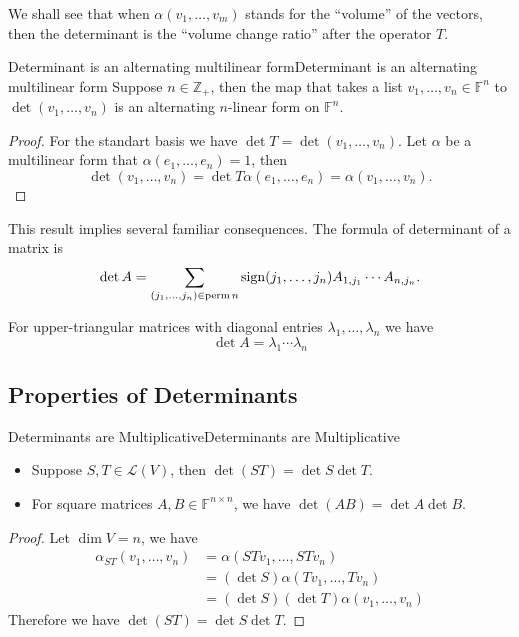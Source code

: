 \documentclass[../main.tex]{subfiles}
\begin{document}
\begin{remark}
We shall see that when $\alpha(v_1, \ldots ,v_m)$ stands for the ``volume'' of the vectors, then the determinant is the ``volume change ratio'' after the operator $T$.
\end{remark}

\begin{theorem}{Determinant is an alternating multilinear form}{Determinant is an alternating multilinear form}
Suppose $n\in \mathbb{Z}_+$, then the map that takes a list $v_1 , \ldots ,v_n\in \mathbb{F}^n$ to $\det (v_1, \ldots ,v_n)$ is an alternating $n$-linear form on $\mathbb{F}^n$.
\end{theorem}
\begin{proof}
For the standart basis we have $\det T = \det (v_1, \ldots ,v_n)$. Let $\alpha$ be a multilinear form that $\alpha(e_1, \ldots ,e_n)=1$, then
\begin{equation*}
\det (v_1, \ldots ,v_n) = \det T \alpha(e_1, \ldots ,e_n) = \alpha(v_1, \ldots ,v_n).
\end{equation*}
\end{proof}

This result implies several familiar consequences. The formula of determinant of a matrix is
\begin{equation}
	\det A = \sum_{(j_1, \ldots ,j_n)\in \operatorname{perm} n} \operatorname{sign} (j_1, \ldots ,j_n) A _{1,j_1} \cdots A _{n,j_n}.
\end{equation}

For upper-triangular matrices with diagonal entries $\lambda_1, \ldots ,\lambda_n$ we have
\begin{equation}
\det A = \lambda_1 \cdots \lambda_n
\end{equation}

\subsection{Properties of Determinants}
\begin{theorem}{Determinants are Multiplicative}{Determinants are Multiplicative}
\begin{itemize}
\item Suppose $S,T\in \mathscr{L}(V)$, then $\det (ST) = \det S \det T$.
\item For square matrices $A,B\in \mathbb{F}^{n \times n}$, we have $\det(AB) = \det A\det B$.
\end{itemize}
\end{theorem}
\begin{proof}
Let $\dim V=n$, we have
\begin{equation*}
\begin{aligned}
	\alpha_{ST}(v_1, \ldots ,v_n) &= \alpha(STv_1, \ldots ,STv_n)\\
	      &= (\det S) \alpha(Tv_1, \ldots ,Tv_n)\\
	      &= (\det S)(\det T) \alpha(v_1, \ldots ,v_n)
\end{aligned}
\end{equation*}
Therefore we have $\det (ST) = \det S \det T$.
\end{proof}
\end{document}
